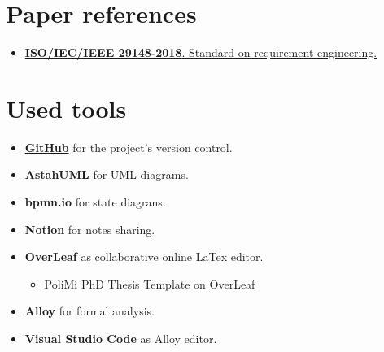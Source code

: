 \section{Paper references}
\label{sec:paper_references}%
\begin{itemize}
    \item \href{https://ieeexplore.ieee.org/document/8559686}{\textbf{ISO/IEC/IEEE 29148-2018}. Standard on requirement engineering.}
\end{itemize}


\section{Used tools}
\label{sec:used_tools}%
\begin{itemize}
    \item \href{https://github.com/MattiaBelfiore/BelfioreBenedettiBuccheri}{\textbf{GitHub}} for the project's version control.
    \item \textbf{AstahUML} for UML diagrams.
    \item \textbf{bpmn.io} for state diagrans.
    \item \textbf{Notion} for notes sharing.
    \item \textbf{OverLeaf} as collaborative online LaTex editor.
    \begin{itemize}
        \item PoliMi PhD Thesis Template on OverLeaf
    \end{itemize}
    \item \textbf{Alloy} for formal analysis.
    \item \textbf{Visual Studio Code} as Alloy editor.
\end{itemize}
